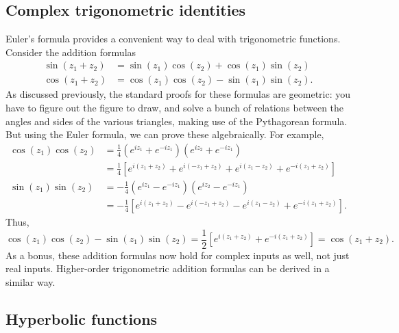 \documentclass[10pt,a4paper]{article}
\begin{document}
\subsection{Complex trigonometric identities}
\label{complex-trigo}

Euler's formula provides a convenient way to deal with trigonometric
functions. Consider the addition formulas
\begin{align}
  \sin(z_1 + z_2) &= \sin(z_1) \cos(z_2) + \cos(z_1)\sin(z_2) \\
  \cos(z_1 + z_2) &= \cos(z_1) \cos(z_2) - \sin(z_1)\sin(z_2).
\end{align}
As discussed previously, the standard proofs for these formulas are
geometric: you have to figure out the figure to draw, and solve a
bunch of relations between the angles and sides of the various
triangles, making use of the Pythagorean formula. But using the Euler
formula, we can prove these algebraically.  For example,
\begin{align}
  \cos(z_1)\cos(z_2) &= \frac{1}{4}\left(e^{iz_1} + e^{-iz_1}\right) \left(e^{iz_2} + e^{-iz_1}\right)\\
  &= \frac{1}{4}\left[e^{i(z_1+z_2)} + e^{i(-z_1 + z_2)} + e^{i(z_1 -z_2)} + e^{-i(z_1+z_2)}\right] \\
  \sin(z_1)\sin(z_2) &= -\frac{1}{4}\left(e^{iz_1} - e^{-iz_1}\right) \left(e^{iz_2} - e^{-iz_1}\right) \\
  &= -\frac{1}{4}\left[e^{i(z_1+z_2)} - e^{i(-z_1 + z_2)} - e^{i(z_1 -z_2)} + e^{-i(z_1+z_2)}\right].
\end{align}
Thus,
\begin{equation}
  \cos(z_1) \cos(z_2) - \sin(z_1)\sin(z_2)
  = \frac{1}{2}\left[e^{i(z_1+z_2)} + e^{-i(z_1+z_2)}\right] = \cos(z_1 + z_2).
\end{equation}
As a bonus, these addition formulas now hold for complex inputs as
well, not just real inputs. Higher-order trigonometric addition
formulas can be derived in a similar way.

\subsection{Hyperbolic functions}\label{hyperbolic-functions}
\end{document}
